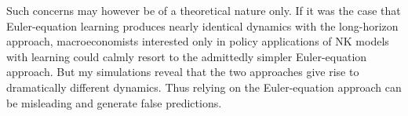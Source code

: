 \documentclass[11pt]{article}
\renewcommand{\[}{\begin{equation}}
\renewcommand{\]}{\end{equation}}
\begin{document}
Such concerns may however be of a theoretical nature only. If it was the case that Euler-equation learning produces nearly identical dynamics with the long-horizon approach, macroeconomists interested only in policy applications of NK models with learning could calmly resort to the admittedly simpler Euler-equation approach. But my simulations reveal that the two approaches give rise to dramatically different dynamics. Thus relying on the Euler-equation approach can be misleading and generate false predictions. 



\nocite{*}
\end{document}
